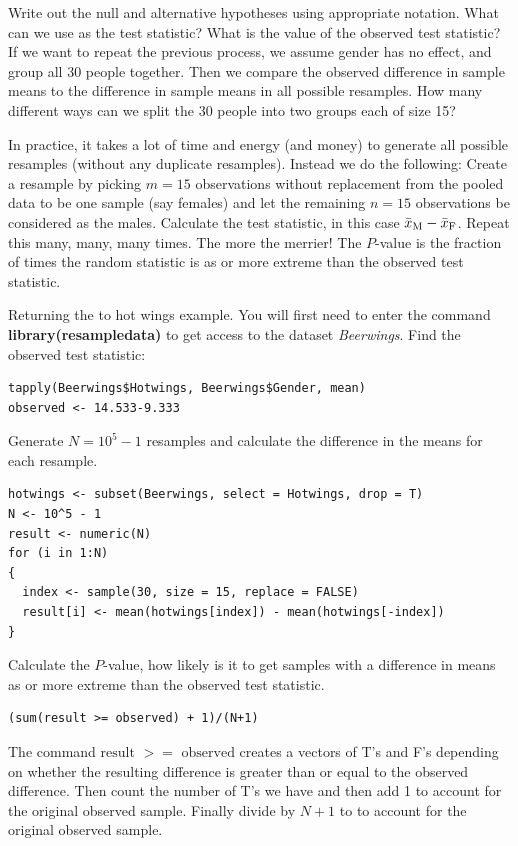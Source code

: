 \bb
\ii Write out the null and alternative hypotheses using appropriate notation. \vfill
\ii What can we use as the test statistic? What is the value of the observed test statistic? \vfill
\ii If we want to repeat the previous process, we assume gender has no effect, and group all 30 people together. Then we compare the observed difference in sample means to the difference in sample means in all possible resamples. How many different ways can we split the 30 people into two groups each of size 15? \vfill
\ee
\ee

\clearpage

\bbox
In practice, it takes a lot of time and energy (and money) to generate all possible resamples (without any duplicate resamples). Instead we do the following:
\bi
\ii Create a resample by picking $m=15$ observations without replacement from the pooled data to be one sample (say females)
and let the remaining $n=15$ observations be considered as the males.
\ii Calculate the test statistic, in this case $\bar{x}_{\rm{M}} - \bar{x}_{\rm{F}}$.
\ii Repeat this many, many, many times. The more the merrier!
\ii The $P$-value is the fraction of times the random statistic is as or more extreme than the observed test statistic.
\ei
\ebox

\bb[resume]
\ii Returning the to hot wings example. You will first need to enter the command \textbf{library(resampledata)} to get access to the dataset \textit{Beerwings}.
\bb
\ii Find the observed test statistic:
\begin{lstlisting}
tapply(Beerwings$Hotwings, Beerwings$Gender, mean) 
observed <- 14.533-9.333
\end{lstlisting}
\ii Generate $N=10^5-1$ resamples and calculate the difference in the means for each resample.
\begin{lstlisting}
hotwings <- subset(Beerwings, select = Hotwings, drop = T)
N <- 10^5 - 1
result <- numeric(N)
for (i in 1:N)
{
  index <- sample(30, size = 15, replace = FALSE)
  result[i] <- mean(hotwings[index]) - mean(hotwings[-index])
}
\end{lstlisting}
\ii Calculate the $P$-value, how likely is it to get samples with a difference in means as or more extreme than the observed test
statistic.
\begin{lstlisting}
(sum(result >= observed) + 1)/(N+1)
\end{lstlisting}
\bi
\ii The command $\mbox{result } >= \mbox{ observed}$ creates a vectors of T's and F's depending on whether the resulting difference is greater than or equal to the observed difference.
\ii Then count the number of T's we have and then add 1 to account for the original observed sample.
\ii Finally divide by $N+1$ to to account for the original observed sample.
\ei
\ee
\ee

